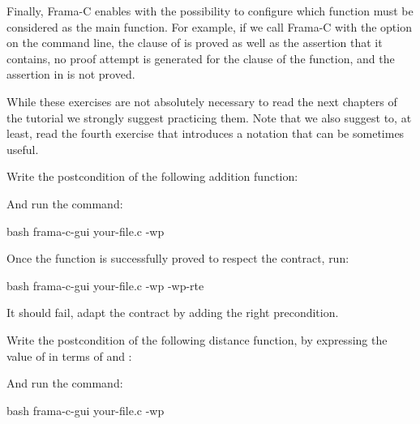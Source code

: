

Finally, Frama-C enables with the possibility to configure which function
must be considered as the main function. For example, if we call Frama-C with
the option  on the command line, the 
clause of  is proved as well as the assertion that it contains,
no proof attempt is generated for the  clause of the
 function, and the assertion in  is not
proved.







While these exercises are not absolutely necessary to read the next chapters
of the tutorial we strongly suggest practicing them. Note that we also
suggest to, at least, read the fourth exercise that introduces a notation
that can be sometimes useful.





Write the postcondition of the following addition function:




And run the command:


\begin{CodeBlock}{bash}
frama-c-gui your-file.c -wp
\end{CodeBlock}


Once the function is successfully proved to respect the contract, run:


\begin{CodeBlock}{bash}
frama-c-gui your-file.c -wp -wp-rte
\end{CodeBlock}


It should fail, adapt the contract by adding the right precondition.




Write the postcondition of the following distance function, by expressing
the value of  in terms of  and
:




And run the command:


\begin{CodeBlock}{bash}
frama-c-gui your-file.c -wp
\end{CodeBlock}


